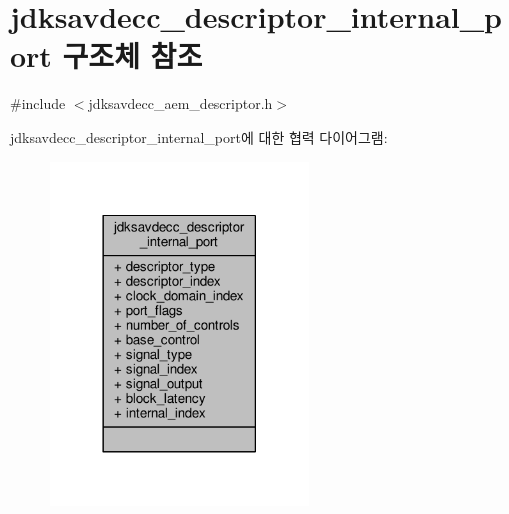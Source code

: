 \hypertarget{structjdksavdecc__descriptor__internal__port}{}\section{jdksavdecc\+\_\+descriptor\+\_\+internal\+\_\+port 구조체 참조}
\label{structjdksavdecc__descriptor__internal__port}


{\ttfamily \#include $<$jdksavdecc\+\_\+aem\+\_\+descriptor.\+h$>$}



jdksavdecc\+\_\+descriptor\+\_\+internal\+\_\+port에 대한 협력 다이어그램\+:
\nopagebreak
\begin{figure}[H]
\begin{center}
\leavevmode
\includegraphics[width=194pt]{structjdksavdecc__descriptor__internal__port__coll__graph}
\end{center}
\end{figure}
